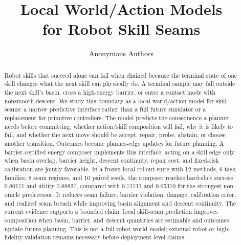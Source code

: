 \documentclass{article}
\title{Local World/Action Models\\for Robot Skill Seams}
\author{Anonymous Authors}
\begin{document}
\maketitle
\begin{abstract}
Robot skills that succeed alone can fail when chained because the terminal state of one skill changes what the next skill can physically do. A terminal sample may fall outside the next skill's basin, cross a high-energy barrier, or enter a contact mode with nonsmooth descent. We study this boundary as a local world/action model for skill seams: a narrow predictive interface rather than a full future simulator or a replacement for primitive controllers. The model predicts the consequence a planner needs before committing: whether action/skill composition will fail, why it is likely to fail, and whether the next move should be accept, repair, probe, abstain, or choose another transition. Outcomes become planner-edge updates for future planning. A barrier-certified energy composer implements this interface, acting on a skill edge only when basin overlap, barrier height, descent continuity, repair cost, and fixed-risk calibration are jointly favorable. In a frozen local rollout suite with 12 methods, 6 task families, 8 seam regimes, and 10 paired seeds, the composer reaches hard-slice success 0.80171 and utility 0.88827, compared with 0.71711 and 0.65310 for the strongest non-oracle predecessor. It reduces seam failure, barrier violation, damage, calibration error, and realized seam breach while improving basin alignment and descent continuity. The current evidence supports a bounded claim: local skill-seam prediction improves composition when basin, barrier, and descent quantities are estimable and outcomes update future planning. This is not a full robot world model; external robot or high-fidelity validation remains necessary before deployment-level claims.
\end{abstract}
\end{document}
